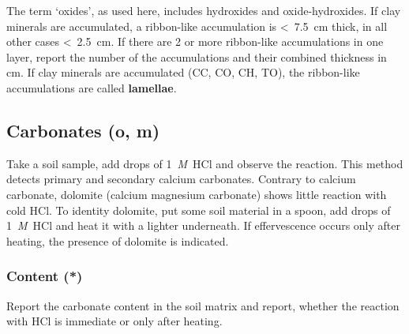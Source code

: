 \documentclass[
  letterpaper,
  DIV=11,
  numbers=noendperiod]{scrreprt}
\begin{document}
The term `oxides', as used here, includes hydroxides and
oxide-hydroxides. If clay minerals are accumulated, a ribbon-like
accumulation is \textless~7.5~cm thick, in all other cases
\textless~2.5~cm. If there are 2 or more ribbon-like accumulations in
one layer, report the number of the accumulations and their combined
thickness in cm. If clay minerals are accumulated (CC, CO, CH, TO), the
ribbon-like accumulations are called \textbf{lamellae}.

\hypertarget{carbonates-o-m}{%
\subsection{Carbonates (o, m)}\label{carbonates-o-m}}

Take a soil sample, add drops of 1~\emph{M}~HCl and observe the
reaction. This method detects primary and secondary calcium carbonates.
Contrary to calcium carbonate, dolomite (calcium magnesium carbonate)
shows little reaction with cold HCl. To identity dolomite, put some soil
material in a spoon, add drops of 1~\emph{M}~HCl and heat it with a
lighter underneath. If effervescence occurs only after heating, the
presence of dolomite is indicated.

\hypertarget{content}{%
\subsubsection{Content (*)}\label{content}}

Report the carbonate content in the soil matrix and report, whether the
reaction with HCl is immediate or only after heating.
\end{document}
